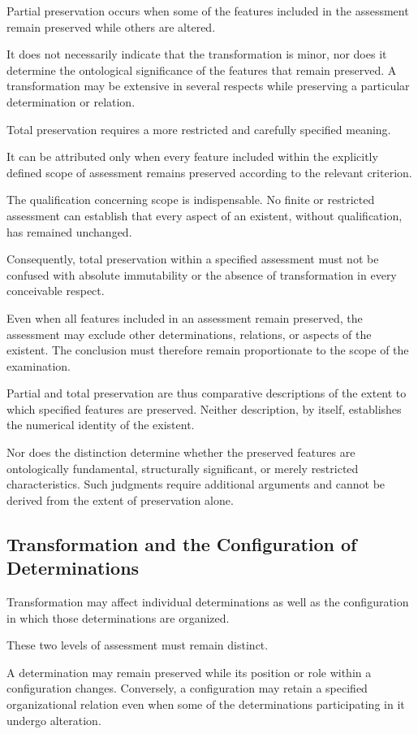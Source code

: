 Partial preservation occurs when some of the features
included in the assessment remain preserved while
others are altered.

It does not necessarily indicate that the transformation
is minor, nor does it determine the ontological
significance of the features that remain preserved.
A transformation may be extensive in several respects
while preserving a particular determination or relation.

Total preservation requires a more restricted and
carefully specified meaning.

It can be attributed only when every feature included
within the explicitly defined scope of assessment
remains preserved according to the relevant criterion.

The qualification concerning scope is indispensable.
No finite or restricted assessment can establish
that every aspect of an existent, without qualification,
has remained unchanged.

Consequently, total preservation within a specified
assessment must not be confused with absolute
immutability or the absence of transformation in
every conceivable respect.

Even when all features included in an assessment
remain preserved, the assessment may exclude other
determinations, relations, or aspects of the existent.
The conclusion must therefore remain proportionate
to the scope of the examination.

Partial and total preservation are thus comparative
descriptions of the extent to which specified features
are preserved. Neither description, by itself,
establishes the numerical identity of the existent.

Nor does the distinction determine whether the
preserved features are ontologically fundamental,
structurally significant, or merely restricted
characteristics. Such judgments require additional
arguments and cannot be derived from the extent
of preservation alone.

\subsection{Transformation and the Configuration of Determinations}

Transformation may affect individual determinations
as well as the configuration in which those
determinations are organized.

These two levels of assessment must remain distinct.

A determination may remain preserved while its
position or role within a configuration changes.
Conversely, a configuration may retain a specified
organizational relation even when some of the
determinations participating in it undergo alteration.

